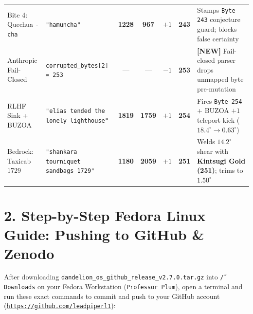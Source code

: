 \documentclass[10pt,twocolumn,letterpaper]{article}
\begin{document}
\begin{table}[t]
\begin{tabularx}{\textwidth}{>{\raggedright\arraybackslash}p{31mm} >{\raggedright\arraybackslash}p{39mm} c c c c >{\raggedright\arraybackslash}X}
Bite 4: Quechua \texttt{-cha} & \texttt{"hamuncha"} & \textbf{1228} & \textbf{967} & $+1$ & \textbf{243} & Stamps \texttt{Byte 243} conjecture guard; blocks false certainty \\
Anthropic Fail-Closed & \texttt{corrupted\_bytes[2] = 253} & --- & --- & $-1$ & \textbf{253} & \textbf{[NEW]} Fail-closed parser drops unmapped byte pre-mutation \\
RLHF Sink + BUZOA & \texttt{"elias tended the lonely lighthouse"} & \textbf{1819} & \textbf{1759} & $+1$ & \textbf{254} & Fires \texttt{Byte 254} + BUZOA $+1$ teleport kick ($18.4^\circ \to 0.63^\circ$) \\
Bedrock: Taxicab 1729 & \texttt{"shankara tourniquet sandbags 1729"} & \textbf{1180} & \textbf{2059} & $+1$ & \textbf{251} & Welds $14.2^\circ$ shear with \textbf{Kintsugi Gold (251)}; trims to $1.50^\circ$ \\
\bottomrule
\end{tabularx}
\end{table}

\section*{2. Step-by-Step Fedora Linux Guide: Pushing to GitHub \& Zenodo}

After downloading \texttt{dandelion\_os\_github\_release\_v2.7.0.tar.gz} into \texttt{\~/Downloads} on your Fedora Workstation (\texttt{Professor Plum}), open a terminal and run these exact commands to commit and push to your GitHub account (\href{https://github.com/leadpiperl1}{\texttt{https://github.com/leadpiperl1}}):
\end{document}
